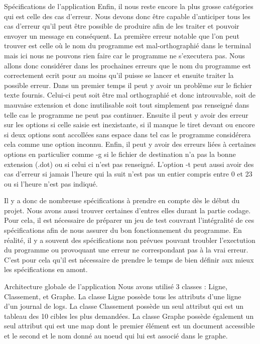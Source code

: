 \documentclass{article}
\begin{document}
\begin{section}{Spécifications de l'application}
Enfin, il nous reste encore la plus grosse catégories qui est celle des cas d'erreur. Nous devons donc être capable d'anticiper tous les cas d'erreur qu'il peut être possible de produire afin de les traiter et pouvoir envoyer un message en conséquent.
La première erreur notable que l'on peut trouver est celle où le nom du programme est mal-orthographié dans le terminal mais ici nous ne pouvons rien faire car le programme ne s'executera pas. Nous allons donc considérer dans les prochaines erreurs que le nom du programme est correctement ecrit pour au moins qu'il puisse se lancer et ensuite traiter la possible erreur.
Dans un premier temps il peut y avoir un problème sur le fichier texte fournis. Celui-ci peut soit être mal orthographié et donc introuvable, soit de mauvaise extension et donc inutilisable soit tout simplement pas renseigné dans telle cas le programme ne peut pas continuer.
Ensuite il peut y avoir des erreur sur les options si celle saisie est inexistante, si il manque le tiret devant ou encore si deux options sont accollées sans espace dans tel cas le programme considérera cela comme une option inconnu.
Enfin, il peut y avoir des erreurs liées à certaines options en particulier comme -g si le fichier de destination n'a pas la bonne extension (.dot) ou si celui ci n'est pas renseigné. L'option -t peut aussi avoir des cas d'erreur si jamais l'heure qui la suit n'est pas un entier compris entre 0 et 23 ou si l'heure n'est pas indiqué.

Il y a donc de nombreuse spécifications à prendre en compte dès le début du projet. Nous avons aussi trouver certaines d'entres elles durant la partie codage. Pour cela, il est nécessaire de préparer un jeu de test couvrant l'intégralité de ces spécifications afin de nous assurer du bon fonctionnement du programme.
En réalité, il y a souvent des spécifications non prévues  pouvant troubler l'exectution du programme ou provoquant une erreur ne correspondant pas à la vrai erreur. C'est pour cela qu'il est nécessaire de prendre le temps de bien définir aux mieux les spécifications en amont.
\end{section}

\begin{section}{Architecture globale de l'application}
Nous avons utilisé 3 classes : Ligne, Classement, et Graphe. La classe Ligne possède tous les attributs d'une ligne d'un journal de logs. La classe Classement possède un seul attribut qui est un tableau des 10 cibles les plus demandées. La classe Graphe possède également un seul attribut qui est une map dont le premier élément est un document accessible et le second et le nom donné au noeud qui lui est associé dans le graphe.
\end{section}
\end{document}
